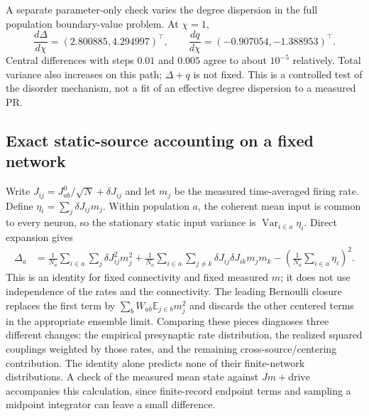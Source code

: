 A separate parameter-only check varies the degree dispersion in the full
population boundary-value problem. At $\chi=1$,
\begin{equation}
 \frac{d\Delta}{d\chi}=(2.800885,4.294997)^\top,\qquad
 \frac{dq}{d\chi}=(-0.907054,-1.388953)^\top.
\end{equation}
Central differences with steps $0.01$ and $0.005$ agree to about
$10^{-5}$ relatively. Total variance also increases on this path;
$\Delta+q$ is not fixed. This is a controlled test of the disorder mechanism,
not a fit of an effective degree dispersion to a measured PR.

\subsection{Exact static-source accounting on a fixed network}
Write $J_{ij}=J^0_{ab}/\sqrt N+\delta J_{ij}$ and let $m_j$ be the
measured time-averaged firing rate. Define
$\eta_i=\sum_j\delta J_{ij}m_j$. Within population $a$, the coherent
mean input is common to every neuron, so the stationary static input
variance is $\operatorname{Var}_{i\in a}\eta_i$. Direct expansion gives
\begin{align}
 \Delta_a
 &=\frac1{N_a}\sum_{i\in a}\sum_j\delta J_{ij}^2m_j^2
 +\frac1{N_a}\sum_{i\in a}\sum_{j\ne k}
           \delta J_{ij}\delta J_{ik}m_jm_k
 -\left(\frac1{N_a}\sum_{i\in a}\eta_i\right)^2.
 \label{eq:fixed-static-source-accounting}
\end{align}
This is an identity for fixed connectivity and fixed measured $m$; it does
not use independence of the rates and the connectivity. The leading
Bernoulli closure replaces the first term by
$\sum_bW_{ab}\mathbb E_{j\in b}m_j^2$ and discards the other centered
terms in the appropriate ensemble limit. Comparing these pieces diagnoses
three different changes: the empirical presynaptic rate distribution,
the realized squared couplings weighted by those rates, and the remaining
cross-source/centering contribution. The identity alone predicts none of
their finite-network distributions.
A check of the measured mean state against $Jm+\mathrm{drive}$ accompanies
this calculation, since finite-record endpoint terms and sampling a
midpoint integrator can leave a small difference.

